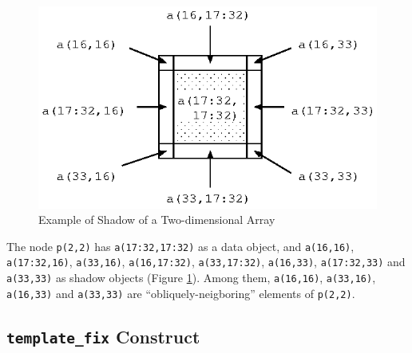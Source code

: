 \begin{minipage}{0.5\hsize}
\begin{center}

\end{center}
\end{minipage}
%
\hspace{0.5cm}
%
\begin{minipage}{0.4\hsize}
\begin{figure}[H]
\begin{center}
\includegraphics[width=\hsize]{figs/fig3.1.eps}
\end{center}
\caption{Example of Shadow of a Two-dimensional Array}
\label{fig3.1}
\end{figure}
\end{minipage}

\vspace{0.5cm}

The node {\tt p(2,2)} has {\tt a(17:32,17:32)} as a data object, and
{\tt a(16,16)}, {\tt a(17:32,16)}, {\tt a(33,16)}, {\tt a(16,17:32)},
{\tt a(33,17:32)}, {\tt a(16,33)}, {\tt a(17:32,33)} and {\tt a(33,33)}
as shadow objects (Figure \ref{fig3.1}). Among them, {\tt a(16,16)},
{\tt a(33,16)}, {\tt a(16,33)} and {\tt a(33,33)} are
``obliquely-neigboring'' elements of {\tt p(2,2)}.


\subsection{{\tt template\_fix} Construct}
\label{subsec:template_fix directive}

